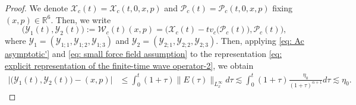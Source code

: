 \documentclass[reqno, 11pt, letterpaper]{amsart}
\theoremstyle{remark}
\numberwithin{equation}{section}
\numberwithin{theorem}{section}
\numberwithin{table}{section}
\numberwithin{figure}{section}
\begin{document}
\begin{proof}
We denote $\mathcal{X}_c(t)=\mathcal{X}_c(t,0,x,p)$ and $\mathcal{P}_c(t)=\mathcal{P}_c(t,0,x,p)$ fixing $(x,p)\in\mathbb{R}^6$.  Then, 
we write 
$$\big(\mathcal{Y}_1(t), \mathcal{Y}_2(t)\big):=\mathcal{W}_c(t)(x,p)=\Big(\mathcal{X}_c(t)-tv_c\big(\mathcal{P}_c(t)\big), \mathcal{P}_c(t)\Big),$$
where $\mathcal{Y}_1=(\mathcal{Y}_{1;1}, \mathcal{Y}_{1;2}, \mathcal{Y}_{1;3})$ and $\mathcal{Y}_2=(\mathcal{Y}_{2;1}, \mathcal{Y}_{2;2}, \mathcal{Y}_{2;3})$. Then, applying \eqref{eq: Ac asymptotic'} and \eqref{eq: small force field assumption} to the representation \eqref{eq: explicit representation of the finite-time wave operator-2}, we obtain 
$$\begin{aligned}
\big|\big(\mathcal{Y}_1(t), \mathcal{Y}_2(t)\big)-(x,p)\big|&\leq\int_0^t (1+\tau)\|E(\tau)\|_{L_x^\infty} d\tau\lesssim \int_0^t (1+\tau)\frac{\eta_0}{(1+\tau)^{\alpha+1}} d\tau\lesssim\eta_0.
\end{aligned}$$


\end{proof}
\end{document}
